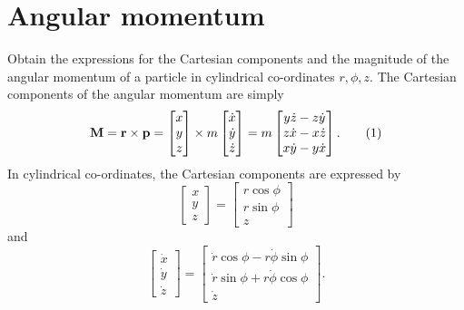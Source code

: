 \section{Angular momentum}


\begin{problem}
{
Obtain the expressions for the Cartesian components and the magnitude of the angular momentum of a particle in cylindrical co-ordinates $r,\phi,z$.
}
{
The Cartesian components of the angular momentum are simply
\begin{equation*}
    \mathbf{M} = \mathbf{r} \times \mathbf{p} = \begin{bmatrix} x \\ y \\ z \end{bmatrix} \times m \begin{bmatrix} \Dot{x} \\ \Dot{y} \\ \Dot{z} \end{bmatrix} = m \begin{bmatrix} y \Dot{z} - z \Dot{y} \\ z \Dot{x} - x \Dot{z} \\ x \Dot{y} - y \Dot{x} \end{bmatrix} . \numberthis \label{C3P3_M}
\end{equation*}
In cylindrical co-ordinates, the Cartesian components are expressed by
\begin{equation*}
    \begin{bmatrix} x \\ y \\ z \end{bmatrix} = \begin{bmatrix} r \cos{\phi} \\ r \sin{\phi} \\ z \end{bmatrix}
\end{equation*}
and
\begin{equation*}
    \begin{bmatrix} \Dot{x} \\ \Dot{y} \\ \Dot{z} \end{bmatrix} = \begin{bmatrix} \Dot{r}\cos{\phi} - r\Dot{\phi}\sin{\phi} \\ \Dot{r}\sin{\phi} + r\Dot{\phi}\cos{\phi} \\ \Dot{z} \end{bmatrix}.

\end{equation*}}
\end{problem}
